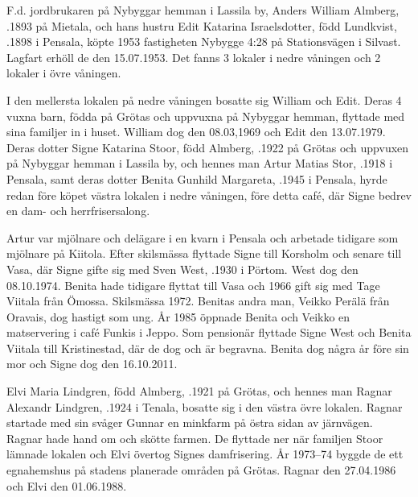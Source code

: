 %
\jhvspace{}


%
F.d. jordbrukaren på Nybyggar hemman i Lassila by, Anders William Almberg, .1893 på Mietala, och hans hustru Edit Katarina Israelsdotter, född Lundkvist, .1898 i Pensala, köpte 1953 fastigheten Nybygge 4:28 på Stationsvägen i Silvast. Lagfart erhöll de den 15.07.1953. Det fanns 3 lokaler i nedre våningen och 2 lokaler i övre våningen.

I den mellersta lokalen på nedre våningen bosatte sig William och Edit. Deras 4 vuxna barn, födda på Grötas och uppvuxna på Nybyggar hemman, flyttade med sina familjer in i huset. William dog den 08.03,1969 och Edit den 13.07.1979. Deras dotter Signe Katarina Stoor, född Almberg, .1922 på Grötas och uppvuxen på Nybyggar hemman i Lassila by, och hennes man Artur Matias Stor, .1918 i Pensala, samt deras dotter Benita Gunhild Margareta, .1945 i Pensala, hyrde redan före köpet västra lokalen i nedre våningen, före detta café, där Signe bedrev en dam- och herrfrisersalong.


Artur var mjölnare och delägare i en kvarn i Pensala och arbetade tidigare som mjölnare på Kiitola. Efter skilsmässa flyttade Signe till Korsholm och senare till Vasa, där Signe gifte sig med Sven West, .1930 i Pörtom. West dog den 08.10.1974.  Benita hade tidigare flyttat till Vasa och 1966 gift sig med Tage Viitala från Ömossa.  Skilsmässa 1972. Benitas andra man, Veikko Perälä från Oravais, dog hastigt som ung. År 1985 öppnade Benita och Veikko en matservering i café Funkis i Jeppo. Som pensionär flyttade Signe West och Benita Viitala till Kristinestad, där de dog och är begravna. Benita dog några år före sin mor och Signe dog den 16.10.2011.

Elvi Maria Lindgren, född Almberg, .1921 på Grötas, och hennes man Ragnar Alexandr Lindgren, .1924 i Tenala, bosatte sig i den västra övre lokalen. Ragnar startade med sin svåger Gunnar en minkfarm på östra sidan av järnvägen. Ragnar hade hand om och skötte farmen. De flyttade ner när familjen Stoor lämnade lokalen och Elvi övertog Signes damfrisering. År 1973--74 byggde de ett egnahemshus på stadens planerade områden på Grötas. Ragnar den 27.04.1986 och Elvi den 01.06.1988.

